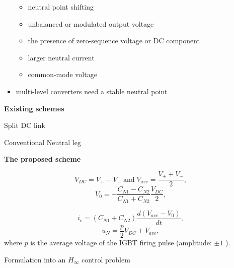 \documentclass[landscape,a0,final]{a0poster}
\newcommand{\mysubsection}[1]{
  \vspace{1cm}
  {\bf\textcolor{TextCol}{#1}}
  \par\vspace{0.75cm}
}
\newcommand{\myfig}[3][0]{
\begin{center}
  \vspace{0.5cm}
  \scalebox{0.75}{\texttt{[image: \#2]}}
  \nobreak\medskip
\end{center}}
\newcommand{\bp}[4]{%
\begin{minipage}{16.1cm}
  \begin{minipage}{#1}
  #2
  \end{minipage} \hfill \begin{minipage}{#3}
  #4
 \end{minipage}
\end{minipage}
}
\begin{document}
\begin{multicols}{6}
\begin{itemize}
\begin{itemize}
\item neutral point shifting
\item unbalanced or modulated output voltage
\item the presence of zero-sequence voltage or DC component 
\item larger neutral current
\item common-mode voltage
\end{itemize}
\item multi-level converters need a stable neutral point
\end{itemize}

\mysubsection{Existing schemes}

\bp{6.5cm}{
\myfig{../../work/NeutralLeg/splitDC_c.eps}{1.2}
\centering Split DC link
}{9.2cm}{
\myfig{../../work/NeutralLeg/conventional4leg_c.eps}{1.2} 
Conventional Neutral leg
}

\mysubsection{The proposed scheme}

\myfig{../../work/NeutralLeg/circuit_2CR_c.eps}{0.9}

\[
V_{DC}=V_{+}-V_{-} \;  \textrm{and}  \; V_{ave}=\frac{V_{+}+V_{-}}{2},\]
\[
V_{0}=-\frac{C_{N1}-C_{N2}}{C_{N1}+C_{N2}}\frac{V_{DC}}{2},\]

\[
i_{c}=(C_{N1}+C_{N2})\frac{d(V_{ave}-V_{0})}{dt},\]
\[
u_{N}=\frac{p}{2}V_{DC}+V_{ave},\]
where $p$ is the average voltage of the IGBT firing pulse (amplitude: $ \pm 1$ ).

\myfig{../../work/NeutralLeg/blkd_neuL_V0.eps}{0.8} 

Formulation into an $ H_{\infty }$ control problem


\end{multicols}
\end{document}
